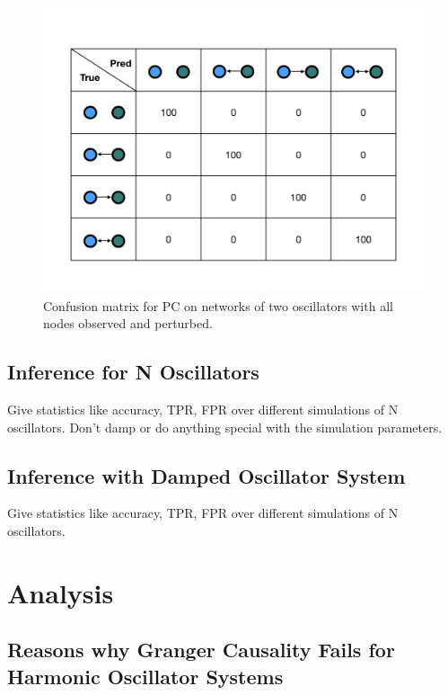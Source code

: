 \documentclass[]{article}
\begin{document}
\begin{figure}
    \centering
    \includegraphics[width=12cm]{Pert2ConfusionMatrix.jpeg}
    \caption{Confusion matrix for PC on networks of two oscillators with all nodes observed and perturbed.}
    \label{fig:example}
\end{figure}

\subsection{Inference for N Oscillators}
Give statistics like accuracy, TPR, FPR over different simulations of N oscillators. Don't damp or do anything special with the simulation parameters.

\subsection{Inference with Damped Oscillator System}
Give statistics like accuracy, TPR, FPR over different simulations of N oscillators.


\section{Analysis}
\subsection{Reasons why Granger Causality Fails for Harmonic Oscillator Systems}
\end{document}
